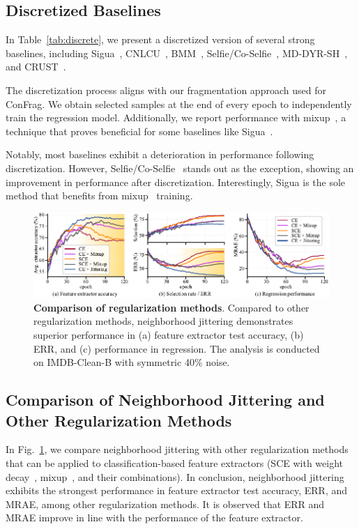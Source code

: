 \documentclass{article}
\theoremstyle{plain}
\theoremstyle{definition}
\theoremstyle{remark}
\begin{document}
\subsection{Discretized Baselines}\label{subsec:discrete_baselines}
In Table~\ref{tab:discrete}, we present a discretized version of several strong baselines, including Sigua~\citep{han20sigua}, CNLCU~\citep{xia22}, BMM~\citep{arazo19}, Selfie/Co-Selfie~\citep{song19b}, MD-DYR-SH~\citep{arazo19}, and CRUST~\citep{mirzasoleiman20crust}.

The discretization process aligns with our fragmentation approach used for ConFrag. We obtain selected samples at the end of every epoch to independently train the regression model. 
Additionally, we report performance with mixup~\citep{zhang18mixup}, a technique that proves beneficial for some baselines like Sigua~\citep{han20sigua}.

Notably, most baselines exhibit a deterioration in performance following discretization. 
However, Selfie/Co-Selfie~\citep{song19b} stands out as the exception, showing an improvement in performance after discretization. 
Interestingly, Sigua is the sole method that benefits from mixup~\citep{zhang18mixup} training.

\begin{figure}[t]
    \begin{center}
    \centerline{\includegraphics[width=\columnwidth]{imgs/jitter_comparison.pdf}}
    \caption{\textbf{Comparison of regularization methods}.
    Compared to other regularization methods, neighborhood jittering demonstrates superior performance in 
    (a) feature extractor test accuracy, (b) ERR, and (c) performance in regression.
    The analysis is conducted on IMDB-Clean-B with symmetric 40\% noise.
    }
    \label{fig:jitter_comparison}
    \end{center}
\end{figure}

\subsection{Comparison of Neighborhood Jittering and Other Regularization Methods}\label{subsec:jitter_comparison}
In Fig.~\ref{fig:jitter_comparison}, we compare neighborhood jittering with other regularization methods 
that can be applied to classification-based feature extractors 
(SCE with weight decay~\citep{wang19sce}, mixup~\citep{zhang18mixup}, and their combinations).
In conclusion, neighborhood jittering exhibits the strongest performance in 
feature extractor test accuracy, ERR, and MRAE, among other regularization methods. 
It is observed that ERR and MRAE improve in line with the performance of the feature extractor.
\end{document}
